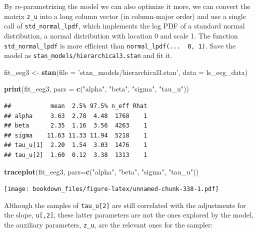 \documentclass[12pt,]{krantz}
\newenvironment{Shaded}{\begin{snugshade}}{\end{snugshade}}
\newcommand{\KeywordTok}[1]{\textcolor[rgb]{0.13,0.29,0.53}{\textbf{#1}}}
\newcommand{\DataTypeTok}[1]{\textcolor[rgb]{0.13,0.29,0.53}{#1}}
\newcommand{\StringTok}[1]{\textcolor[rgb]{0.31,0.60,0.02}{#1}}
\newcommand{\NormalTok}[1]{#1}
\theoremstyle{definition}
\theoremstyle{definition}
\theoremstyle{definition}
\theoremstyle{remark}
\begin{document}
By re-parametrizing the model we can also optimize it more, we can
convert the matrix \texttt{z\_u} into a long column vector (in
column-major order) and use a single call of \texttt{std\_normal\_lpdf},
which implements the log PDF of a standard normal distribution, a normal
distribution with location 0 and scale 1. The function
\texttt{std\_normal\_lpdf} is more efficient than
\texttt{normal\_lpdf(...\ \textbar{}\ 0,\ 1)}. Save the model as
\texttt{stan\_models/hierarchical3.stan} and fit it.

\begin{Shaded}
\begin{Highlighting}[]
\NormalTok{fit_eeg3 <-}\StringTok{ }\KeywordTok{stan}\NormalTok{(}\DataTypeTok{file =} \StringTok{'stan_models/hierarchical3.stan'}\NormalTok{, }
                 \DataTypeTok{data =}\NormalTok{ ls_eeg_data)}
\end{Highlighting}
\end{Shaded}

\begin{Shaded}
\begin{Highlighting}[]
\KeywordTok{print}\NormalTok{(fit_eeg3, }\DataTypeTok{pars =} \KeywordTok{c}\NormalTok{(}\StringTok{"alpha"}\NormalTok{, }\StringTok{"beta"}\NormalTok{, }\StringTok{"sigma"}\NormalTok{, }\StringTok{"tau_u"}\NormalTok{))}
\end{Highlighting}
\end{Shaded}

\begin{verbatim}
##           mean  2.5% 97.5% n_eff Rhat
## alpha     3.63  2.78  4.48  1768    1
## beta      2.35  1.16  3.56  4263    1
## sigma    11.63 11.33 11.94  5218    1
## tau_u[1]  2.20  1.54  3.03  1476    1
## tau_u[2]  1.60  0.12  3.38  1313    1
\end{verbatim}

\begin{Shaded}
\begin{Highlighting}[]
\KeywordTok{traceplot}\NormalTok{(fit_eeg3, }\DataTypeTok{pars=}\KeywordTok{c}\NormalTok{(}\StringTok{"alpha"}\NormalTok{, }\StringTok{"beta"}\NormalTok{, }\StringTok{"sigma"}\NormalTok{, }\StringTok{"tau_u"}\NormalTok{))}
\end{Highlighting}
\end{Shaded}

\texttt{[image: bookdown\_files/figure-latex/unnamed-chunk-338-1.pdf]}

Although the samples of \texttt{tau\_u{[}2{]}} are still correlated with
the adjustments for the slope, \texttt{u{[},2{]}}, these latter
parameters are not the ones explored by the model, the auxiliary
parameters, \texttt{z\_u}, are the relevant ones for the sampler:
\end{document}
